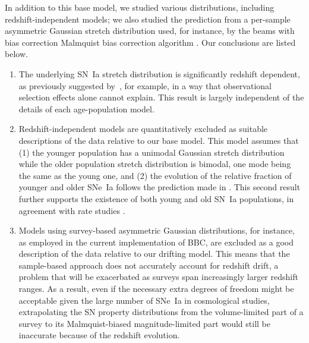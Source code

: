 \documentclass[]{aa}
\begin{document}
In addition to this base model, we studied various distributions, including
redshift-independent models; we also studied the prediction from a per-sample
asymmetric Gaussian stretch distribution used, for instance, by the beams with
bias correction Malmquist bias correction algorithm \citep{scolnic2016,
kessler2017}. Our conclusions are listed below.
\begin{enumerate}

    \item The underlying SN~Ia stretch distribution is significantly redshift
        dependent, as previously suggested by~\cite{howell2007}, for example, in
        a way that observational selection effects alone cannot explain. This
        result is largely independent of the details of each age-population
        model.
    
    \item Redshift-independent models are quantitatively excluded as suitable
        descriptions of the data relative to our base model. This model assumes
        that (1) the younger population has a unimodal Gaussian stretch
        distribution while the older population stretch distribution is bimodal,
        one mode being the same as the young one, and (2) the evolution of the
        relative fraction of younger and older SNe~Ia follows the prediction
        made in \cite{rigault2020}. This second result further supports the
        existence of both young and old SN~Ia populations, in agreement with
        rate studies \citep{mannucci2005, scannapieco2005, sullivan2006,
        aubourg2008}. 
        
    \item Models using survey-based asymmetric Gaussian distributions, for
        instance, as employed in the current implementation of BBC, are excluded
        as a good description of the data relative to our drifting model. This
        means that the sample-based approach does not accurately account for
        redshift drift, a problem that will be exacerbated as surveys span
        increasingly larger redshift ranges. As a result, even if the necessary
        extra degrees of freedom might be acceptable given the large number of
        SNe~Ia in cosmological studies, extrapolating the SN property
        distributions from the volume-limited part of a survey to its
        Malmquist-biased magnitude-limited part would still be inaccurate
        because of the redshift evolution.


\end{enumerate}
\end{document}
